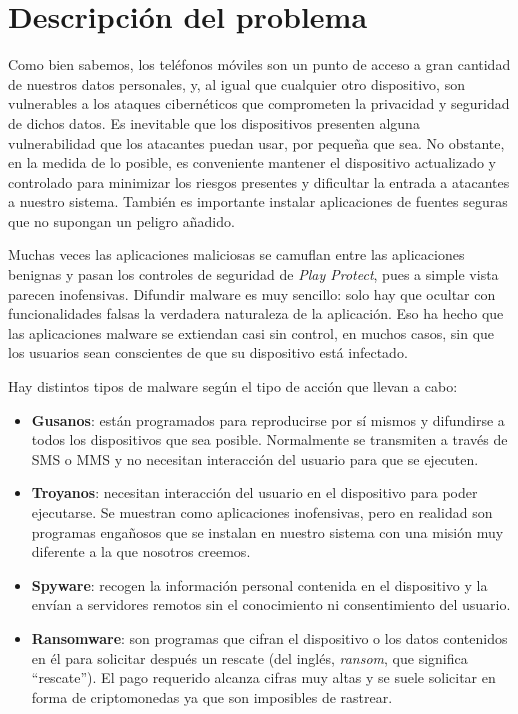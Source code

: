\chapter{Descripción del problema}

Como bien sabemos, los teléfonos móviles son un punto de acceso a gran cantidad de nuestros datos personales, y, al igual que cualquier otro dispositivo, son vulnerables a los ataques cibernéticos que comprometen la privacidad y seguridad de dichos datos. Es inevitable que los dispositivos presenten alguna vulnerabilidad que los atacantes puedan usar, por pequeña que sea. No obstante, en la medida de lo posible, es conveniente mantener el dispositivo actualizado y controlado para minimizar los riesgos presentes y dificultar la entrada a atacantes a nuestro sistema. También es importante instalar aplicaciones de fuentes seguras que no supongan un peligro añadido.

Muchas veces las aplicaciones maliciosas se camuflan entre las aplicaciones benignas y pasan los controles de seguridad de \textit{Play Protect}, pues a simple vista parecen inofensivas. Difundir malware es muy sencillo: solo hay que ocultar con funcionalidades falsas la verdadera naturaleza de la aplicación. Eso ha hecho que las aplicaciones malware se extiendan casi sin control, en muchos casos, sin que los usuarios sean conscientes de que su dispositivo está infectado.

Hay distintos tipos de malware según el tipo de acción que llevan a cabo:

\begin{itemize}
	\item \textbf{Gusanos}: están programados para reproducirse por sí mismos y difundirse a todos los dispositivos que sea posible. Normalmente se transmiten a través de SMS o MMS y no necesitan interacción del usuario para que se ejecuten.
	\item \textbf{Troyanos}: necesitan interacción del usuario en el dispositivo para poder ejecutarse. Se muestran como aplicaciones inofensivas, pero en realidad son programas engañosos que se instalan en nuestro sistema con una misión muy diferente a la que nosotros creemos.
	\item \textbf{Spyware}: recogen la información personal contenida en el dispositivo y la envían a servidores remotos sin el conocimiento ni consentimiento del usuario.
	\item \textbf{Ransomware}: son programas que cifran el dispositivo o los datos contenidos en él para solicitar después un rescate (del inglés, \textit{ransom}, que significa ``rescate''). El pago requerido alcanza cifras muy altas y se suele solicitar en forma de criptomonedas ya que son imposibles de rastrear.
\end{itemize}

